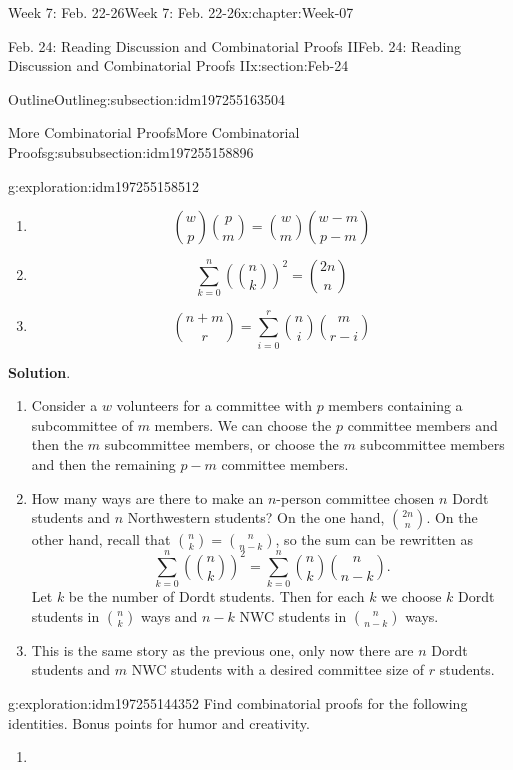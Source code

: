 \documentclass[oneside,10pt,]{book}
\newcommand{\blocktitlefont}{\relax}
\numberwithin{equation}{section}
\begin{document}
\begin{chapterptx}{Week 7: Feb. 22-26}{}{Week 7: Feb. 22-26}{}{}{x:chapter:Week-07}
\begin{sectionptx}{Feb. 24: Reading Discussion and Combinatorial Proofs II}{}{Feb. 24: Reading Discussion and Combinatorial Proofs II}{}{}{x:section:Feb-24}
\begin{subsectionptx}{Outline}{}{Outline}{}{}{g:subsection:idm197255163504}
\begin{subsubsectionptx}{More Combinatorial Proofs}{}{More Combinatorial Proofs}{}{}{g:subsubsection:idm197255158896}
\begin{exploration}{}{g:exploration:idm197255158512}
\begin{enumerate}
\item{}%
\begin{equation*}
\binom{w}{p} \binom{p}{m} = \binom{w}{m} \binom{w-m}{p-m}
\end{equation*}
%
\item{}%
\begin{equation*}
\sum\limits_{k=0}^n \left(\binom{n}{k}\right)^2 = \binom{2n}{n}
\end{equation*}
%
\item{}%
\begin{equation*}
\binom{n+m}{r} = \sum\limits_{i=0}^r \binom{n}{i} \binom{m}{r-i}
\end{equation*}
%
\end{enumerate}
\par\smallskip%
\noindent\textbf{\blocktitlefont Solution}.\hypertarget{g:solution:idm197255155232}{}\quad{}%
\begin{enumerate}
\item{}Consider a \(w\) volunteers for a committee with \(p\) members containing a subcommittee of \(m\) members. We can choose the \(p\) committee members and then the \(m\) subcommittee members, or choose the \(m\) subcommittee members and then the remaining \(p-m\) committee members.%
\item{}How many ways are there to make an \(n\)-person committee chosen \(n\) Dordt students and \(n\) Northwestern students? On the one hand, \(\binom{2n}{n}\). On the other hand, recall that \(\binom{n}{k} = \binom{n}{n-k}\), so the sum can be rewritten as%
\begin{equation*}
\sum\limits_{k=0}^n \left(\binom{n}{k}\right)^2 = \sum\limits_{k=0}^n \binom{n}{k} \binom{n}{n-k}.
\end{equation*}
Let \(k\) be the number of Dordt students. Then for each \(k\) we choose \(k\) Dordt students in \(\binom{n}{k}\) ways and \(n-k\) NWC students in \(\binom{n}{n-k}\) ways.%
\item{}This is the same story as the previous one, only now there are \(n\) Dordt students and \(m\) NWC students with a desired committee size of \(r\) students.%
\end{enumerate}
\end{exploration}%
\begin{exploration}{}{g:exploration:idm197255144352}%
Find combinatorial proofs for the following identities. Bonus points for humor and creativity.%
%
\begin{enumerate}
\item{}%
\begin{equation*}

\end{equation*}
\end{enumerate}
\end{exploration}
\end{subsubsectionptx}
\end{subsectionptx}
\end{sectionptx}
\end{chapterptx}
\end{document}
